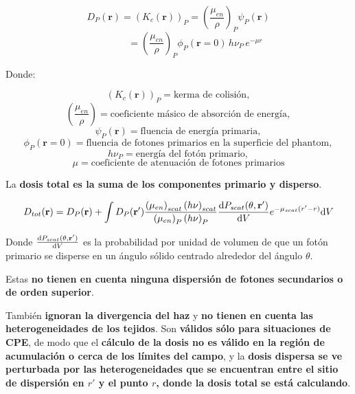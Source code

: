 \documentclass[aspectratio=169,xcolor=dvipsnames,t]{beamer}
\newcommand{\be}{\begin{equation*}}
\newcommand{\ee}{\end{equation*}}
\newcommand{\bae}{\begin{eqnarray}}
\newcommand{\eae}{\end{eqnarray}}
\newcommand{\pl}{\left(}
\newcommand{\pr}{\right)}
\begin{document}
\begin{frame}

    \vspace{-0.2cm}

    \be
    D_P(\mathbf{r}) = \pl K_c(\mathbf{r}) \pr_P = \pl \frac{\mu_{en}}{\rho} \pr_P \psi_{P} (\mathbf{r})
    \ee
    \be
    \quad \quad \quad \, \, \, = \pl \frac{\mu_{en}}{\rho} \pr_P \phi_{P} (\mathbf{r}=0) \, h\nu_P \, e^{-\mu r} 
    \ee

    Donde:

    \vspace{-0.6cm}

    \be
    \pl K_c(\mathbf{r}) \pr_P = \text{kerma de colisión},
    \ee
    \be
    \pl \frac{\mu_{en}}{\rho} \pr = \text{coeficiente másico de absorción de energía}, 
    \ee
    \be
    \psi_{P} (\mathbf{r}) = \text{fluencia de energía primaria},
    \ee
    \be
    \phi_{P} (\mathbf{r}=0) = \text{fluencia de fotones primarios en la superficie del phantom},
    \ee
    \be
    h\nu_P = \text{energía del fotón primario}, 
    \ee
    \be
    \mu = \text{coeficiente de atenuación de fotones primarios}
    \ee

\end{frame}

\begin{frame}

    La \textbf{dosis total es la suma de los componentes primario y disperso}.

    \bae
    D_{tot}(\mathbf{r}) = D_P(\mathbf{r}) + \int D_P(\mathbf{r'}) \frac{\pl \mu_{en} \pr_{scat} \pl h\nu \pr_{scat}}{\pl \mu_{en} \pr_{P} \pl h\nu \pr_{P}} \derivative{P_{scat} (\theta,\mathbf{r'})}{V} e^{-\mu_{scat}(r'-r)} \text{d}V
    \eae
    
    Donde $\derivative{P_{scat} (\theta,\mathbf{r'})}{V}$ es la probabilidad por unidad de volumen de que un fotón primario se disperse en un ángulo sólido centrado alrededor del ángulo $\theta$.

    Estas \textbf{no tienen en cuenta ninguna dispersión de fotones secundarios o de orden superior}.

    También \textbf{ignoran la divergencia del haz} y \textbf{no tienen en cuenta las heterogeneidades de los tejidos}. Son \textbf{válidos sólo para situaciones de CPE}, de modo que el \textbf{cálculo de la dosis no es válido en la región de acumulación o cerca de los límites del campo}, y la \textbf{dosis dispersa se ve perturbada por las heterogeneidades que se encuentran entre el sitio de dispersión en $r'$ y el punto $r$, donde la dosis total se está calculando}.

\end{frame}
\end{document}
